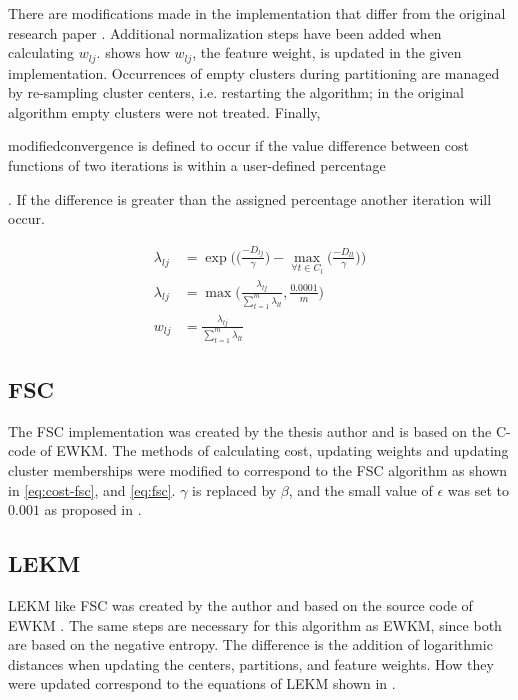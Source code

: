 \documentclass[../report.tex]{subfiles}
\begin{document}
There are modifications made in the implementation that differ from the original research paper \cite{Jing2007}. Additional normalization steps have been added when calculating $w_{lj}$.  shows how $w_{lj}$, the feature weight, is updated in the given implementation. Occurrences of empty clusters during partitioning are managed by re-sampling cluster centers, i.e. restarting the algorithm; in the original algorithm empty clusters were not treated. Finally, \begin{color}{modified}convergence is defined to occur if the value difference between cost functions of two iterations is within a user-defined percentage\end{color}. If the difference is greater than the assigned percentage another iteration will occur.

\begin{align}
  \lambda_{lj} &= \exp\bigg({\Big(\frac{-D_{lj}}{\gamma}\Big) - \max_{\forall{t} \in C_l}\Big({\frac{-D_{lt}}{\gamma}}\Big)}\bigg) \\
  \lambda_{lj} &= \max\bigg(\frac{\lambda_{lj}}{\sum_{t=1}^{m}{\lambda_{lt}}}, \frac{0.0001}{m}\bigg)\\
  \label{eq:newlambda}
  w_{lj} &= \frac{\lambda_{lj}}{\sum^{m}_{t=1}{\lambda_{ lt }}}
\end{align}


\subsection{FSC}
The FSC implementation was created by the thesis author and is based on the C-code of EWKM. The methods of calculating cost, updating weights and updating cluster memberships were modified to correspond to the FSC algorithm as shown in \cref{eq:cost-fsc}, and \cref{eq:fsc}. $\gamma$ is replaced by $\beta$, and the small value of $\epsilon$ was set to $0.001$ as proposed in \cite{Gan2006}.

\subsection{LEKM}
LEKM like FSC was created by the author and based on the source code of EWKM \cite{wskm2014hz}. The same steps are necessary for this algorithm as EWKM, since both are based on the negative entropy. The difference is the addition of logarithmic distances when updating the centers, partitions, and feature weights. How they were updated correspond to the equations of LEKM shown in .
\end{document}

